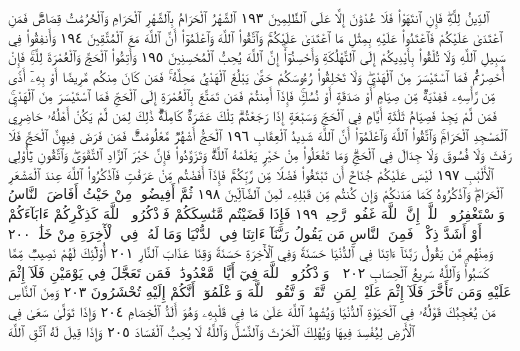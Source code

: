 ٱلدِّينُ لِلَّهِۖ فَإِنِ ٱنتَهَوْا۟ فَلَا عُدْوَٰنَ إِلَّا عَلَى ٱلظَّٰلِمِينَ ١٩٣ ٱلشَّهْرُ ٱلْحَرَامُ
بِٱلشَّهْرِ ٱلْحَرَامِ وَٱلْحُرُمَٰتُ قِصَاصࣱۚ فَمَنِ ٱعْتَدَىٰ عَلَيْكُمْ فَٱعْتَدُوا۟
عَلَيْهِ بِمِثْلِ مَا ٱعْتَدَىٰ عَلَيْكُمْۚ وَٱتَّقُوا۟ ٱللَّهَ وَٱعْلَمُوٓا۟ أَنَّ ٱللَّهَ مَعَ
ٱلْمُتَّقِينَ ١٩٤ وَأَنفِقُوا۟ فِي سَبِيلِ ٱللَّهِ وَلَا تُلْقُوا۟ بِأَيْدِيكُمْ إِلَى ٱلتَّهْلُكَةِ
وَأَحْسِنُوٓا۟ۚ إِنَّ ٱللَّهَ يُحِبُّ ٱلْمُحْسِنِينَ ١٩٥ وَأَتِمُّوا۟ ٱلْحَجَّ وَٱلْعُمْرَةَ لِلَّهِۚ
فَإِنْ أُحْصِرْتُمْ فَمَا ٱسْتَيْسَرَ مِنَ ٱلْهَدْيِۖ وَلَا تَحْلِقُوا۟ رُءُوسَكُمْ حَتَّىٰ يَبْلُغَ
ٱلْهَدْيُ مَحِلَّهُۥۚ فَمَن كَانَ مِنكُم مَّرِيضًا أَوْ بِهِۦٓ أَذࣰى مِّن رَّأْسِهِۦ فَفِدْيَةࣱ
مِّن صِيَامٍ أَوْ صَدَقَةٍ أَوْ نُسُكࣲۚ فَإِذَآ أَمِنتُمْ فَمَن تَمَتَّعَ بِٱلْعُمْرَةِ إِلَى ٱلْحَجِّ
فَمَا ٱسْتَيْسَرَ مِنَ ٱلْهَدْيِۚ فَمَن لَّمْ يَجِدْ فَصِيَامُ ثَلَٰثَةِ أَيَّامࣲ فِي ٱلْحَجِّ
وَسَبْعَةٍ إِذَا رَجَعْتُمْۗ تِلْكَ عَشَرَةࣱ كَامِلَةࣱۗ ذَٰلِكَ لِمَن لَّمْ يَكُنْ أَهْلُهُۥ حَاضِرِي
ٱلْمَسْجِدِ ٱلْحَرَامِۚ وَٱتَّقُوا۟ ٱللَّهَ وَٱعْلَمُوٓا۟ أَنَّ ٱللَّهَ شَدِيدُ ٱلْعِقَابِ ١٩٦
ٱلْحَجُّ أَشْهُرࣱ مَّعْلُومَٰتࣱۚ فَمَن فَرَضَ فِيهِنَّ ٱلْحَجَّ فَلَا
رَفَثَ وَلَا فُسُوقَ وَلَا جِدَالَ فِي ٱلْحَجِّۗ وَمَا تَفْعَلُوا۟ مِنْ
خَيْرࣲ يَعْلَمْهُ ٱللَّهُۗ وَتَزَوَّدُوا۟ فَإِنَّ خَيْرَ ٱلزَّادِ ٱلتَّقْوَىٰۖ
وَٱتَّقُونِ يَٰٓأُو۟لِي ٱلْأَلْبَٰبِ ١٩٧ لَيْسَ عَلَيْكُمْ جُنَاحٌ
أَن تَبْتَغُوا۟ فَضْلࣰا مِّن رَّبِّكُمْۚ فَإِذَآ أَفَضْتُم مِّنْ
عَرَفَٰتࣲ فَٱذْكُرُوا۟ ٱللَّهَ عِندَ ٱلْمَشْعَرِ ٱلْحَرَامِۖ
وَٱذْكُرُوهُ كَمَا هَدَىٰكُمْ وَإِن كُنتُم مِّن قَبْلِهِۦ
لَمِنَ ٱلضَّآلِّينَ ١٩٨ ثُمَّ أَفِيضُوا۟ مِنْ حَيْثُ أَفَاضَ
ٱلنَّاسُ وَٱسْتَغْفِرُوا۟ ٱللَّهَۚ إِنَّ ٱللَّهَ غَفُورࣱ رَّحِيمࣱ ١٩٩
فَإِذَا قَضَيْتُم مَّنَٰسِكَكُمْ فَٱذْكُرُوا۟ ٱللَّهَ كَذِكْرِكُمْ
ءَابَآءَكُمْ أَوْ أَشَدَّ ذِكْرࣰاۗ فَمِنَ ٱلنَّاسِ مَن يَقُولُ
رَبَّنَآ ءَاتِنَا فِي ٱلدُّنْيَا وَمَا لَهُۥ فِي ٱلْأٓخِرَةِ مِنْ خَلَٰقࣲ ٢٠٠
وَمِنْهُم مَّن يَقُولُ رَبَّنَآ ءَاتِنَا فِي ٱلدُّنْيَا حَسَنَةࣰ
وَفِي ٱلْأٓخِرَةِ حَسَنَةࣰ وَقِنَا عَذَابَ ٱلنَّارِ ٢٠١ أُو۟لَٰٓئِكَ
لَهُمْ نَصِيبࣱ مِّمَّا كَسَبُوا۟ۚ وَٱللَّهُ سَرِيعُ ٱلْحِسَابِ ٢٠٢
۞ وَٱذْكُرُوا۟ ٱللَّهَ فِيٓ أَيَّامࣲ مَّعْدُودَٰتࣲۚ فَمَن تَعَجَّلَ فِي
يَوْمَيْنِ فَلَآ إِثْمَ عَلَيْهِ وَمَن تَأَخَّرَ فَلَآ إِثْمَ عَلَيْهِۖ لِمَنِ
ٱتَّقَىٰۗ وَٱتَّقُوا۟ ٱللَّهَ وَٱعْلَمُوٓا۟ أَنَّكُمْ إِلَيْهِ تُحْشَرُونَ ٢٠٣
وَمِنَ ٱلنَّاسِ مَن يُعْجِبُكَ قَوْلُهُۥ فِي ٱلْحَيَوٰةِ ٱلدُّنْيَا
وَيُشْهِدُ ٱللَّهَ عَلَىٰ مَا فِي قَلْبِهِۦ وَهُوَ أَلَدُّ ٱلْخِصَامِ ٢٠٤
وَإِذَا تَوَلَّىٰ سَعَىٰ فِي ٱلْأَرْضِ لِيُفْسِدَ فِيهَا وَيُهْلِكَ ٱلْحَرْثَ
وَٱلنَّسْلَۚ وَٱللَّهُ لَا يُحِبُّ ٱلْفَسَادَ ٢٠٥ وَإِذَا قِيلَ لَهُ ٱتَّقِ ٱللَّهَ
